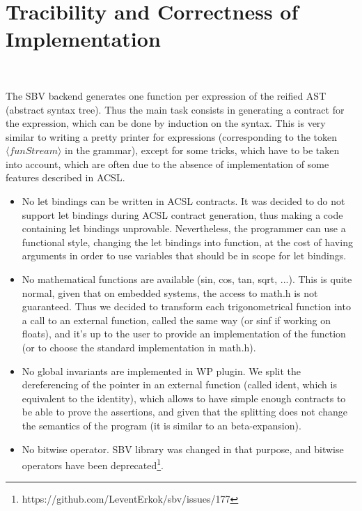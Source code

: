 \section{Tracibility and Correctness of Implementation}~\label{sec:correct}


The SBV backend generates one function per expression of the reified AST (abstract syntax tree). Thus the main task consists in generating a contract for the expression, which can be done by induction on the syntax. This is very similar to writing a pretty printer for expressions (corresponding to the token $\langle funStream \rangle$ in the grammar), except for some tricks, which have to be taken into account, which are often due to the absence of implementation of some features described in ACSL.

\begin{itemize}
	\item No let bindings can be written in ACSL contracts.
	\subitem It was decided to do not support let bindings during ACSL contract generation, thus making a code containing let bindings unprovable. Nevertheless, the programmer can use a functional style, changing the let bindings into function, at the cost of having arguments in order to use variables that should be in scope for let bindings.
	\item No mathematical functions are available (sin, cos, tan, sqrt, ...).
	\subitem This is quite normal, given that on embedded systems, the access to math.h is not guaranteed. Thus we decided to transform each trigonometrical function into a call to an external function, called the same way (or sinf if working on floats), and it's up to the user to provide an implementation of the function (or to choose the standard implementation in math.h).
	\item No global invariants are implemented in WP plugin.
	\subitem We split the dereferencing of the pointer in an external function (called ident, which is equivalent to the identity), which allows to have simple enough contracts to be able to prove the assertions, and given that the splitting does not change the semantics of the program (it is similar to an beta-expansion).
	\item No bitwise operator.
	\subitem SBV library was changed in that purpose, and bitwise operators have been deprecated\footnote{https://github.com/LeventErkok/sbv/issues/177}.
\end{itemize}

